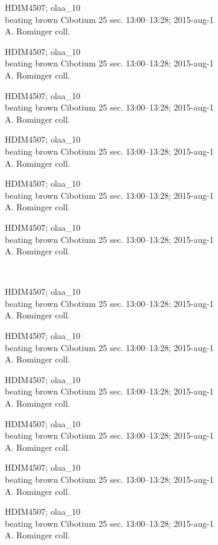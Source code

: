 \documentclass[2pt]{extarticle}
\begin{document}
\noindent
\parbox{0.16\textwidth}{\tiny \raggedright \rule[-0.3\baselineskip]{0pt}{10pt}HDIM4507; olaa\_10\\ beating brown Cibotium 25 sec. 13:00--13:28; 2015-aug-1\\ A. Rominger coll.}
\parbox{0.16\textwidth}{\tiny \raggedright \rule[-0.3\baselineskip]{0pt}{10pt}HDIM4507; olaa\_10\\ beating brown Cibotium 25 sec. 13:00--13:28; 2015-aug-1\\ A. Rominger coll.}
\parbox{0.16\textwidth}{\tiny \raggedright \rule[-0.3\baselineskip]{0pt}{10pt}HDIM4507; olaa\_10\\ beating brown Cibotium 25 sec. 13:00--13:28; 2015-aug-1\\ A. Rominger coll.}
\parbox{0.16\textwidth}{\tiny \raggedright \rule[-0.3\baselineskip]{0pt}{10pt}HDIM4507; olaa\_10\\ beating brown Cibotium 25 sec. 13:00--13:28; 2015-aug-1\\ A. Rominger coll.}
\parbox{0.16\textwidth}{\tiny \raggedright \rule[-0.3\baselineskip]{0pt}{10pt}HDIM4507; olaa\_10\\ beating brown Cibotium 25 sec. 13:00--13:28; 2015-aug-1\\ A. Rominger coll.}
\parbox{0.16\textwidth}{\tiny \raggedright \rule[-0.3\baselineskip]{0pt}{10pt}HDIM4507; olaa\_10\\ beating brown Cibotium 25 sec. 13:00--13:28; 2015-aug-1\\ A. Rominger coll.} \\ 
\vspace{0.001in} 

\noindent
\parbox{0.16\textwidth}{\tiny \raggedright \rule[-0.3\baselineskip]{0pt}{10pt}HDIM4507; olaa\_10\\ beating brown Cibotium 25 sec. 13:00--13:28; 2015-aug-1\\ A. Rominger coll.}
\parbox{0.16\textwidth}{\tiny \raggedright \rule[-0.3\baselineskip]{0pt}{10pt}HDIM4507; olaa\_10\\ beating brown Cibotium 25 sec. 13:00--13:28; 2015-aug-1\\ A. Rominger coll.}
\parbox{0.16\textwidth}{\tiny \raggedright \rule[-0.3\baselineskip]{0pt}{10pt}HDIM4507; olaa\_10\\ beating brown Cibotium 25 sec. 13:00--13:28; 2015-aug-1\\ A. Rominger coll.}
\parbox{0.16\textwidth}{\tiny \raggedright \rule[-0.3\baselineskip]{0pt}{10pt}HDIM4507; olaa\_10\\ beating brown Cibotium 25 sec. 13:00--13:28; 2015-aug-1\\ A. Rominger coll.}
\parbox{0.16\textwidth}{\tiny \raggedright \rule[-0.3\baselineskip]{0pt}{10pt}HDIM4507; olaa\_10\\ beating brown Cibotium 25 sec. 13:00--13:28; 2015-aug-1\\ A. Rominger coll.}
\parbox{0.16\textwidth}{\tiny \raggedright \rule[-0.3\baselineskip]{0pt}{10pt}HDIM4507; olaa\_10\\ beating brown Cibotium 25 sec. 13:00--13:28; 2015-aug-1\\ A. Rominger coll.} \\ 
\vspace{0.001in} 
\end{document}
